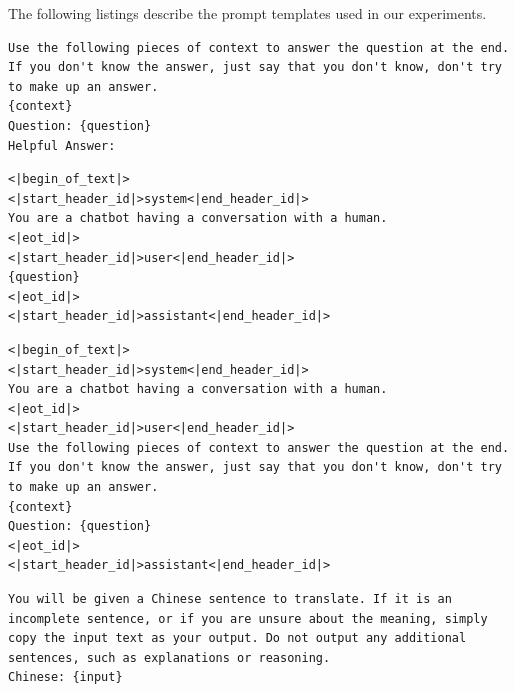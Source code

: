 The following listings describe the prompt templates used in our experiments.

\begin{lstlisting}[caption={RAG - Generic Prompt template for question answering. The placeholders \texttt{\{question\}} and \texttt{\{context\}} are filled with the question and retrieved data, respectively.},label={list:rag-generic},basicstyle=\small\ttfamily,breaklines=true,frame=single]
Use the following pieces of context to answer the question at the end. If you don't know the answer, just say that you don't know, don't try to make up an answer.
{context}
Question: {question}
Helpful Answer:
\end{lstlisting}

\begin{lstlisting}[caption={Non-RAG prompt template for question answering with Llama-3 models. The placeholder \texttt{\{question\}} is filled with the question.},label={list:non-rag},basicstyle=\small\ttfamily,breaklines=true,frame=single]
<|begin_of_text|>
<|start_header_id|>system<|end_header_id|>
You are a chatbot having a conversation with a human.
<|eot_id|>
<|start_header_id|>user<|end_header_id|>
{question}
<|eot_id|>
<|start_header_id|>assistant<|end_header_id|>
\end{lstlisting}

\begin{lstlisting}[caption={RAG - Chat Template for Llama-3 models. The placeholders \texttt{\{question\}} and \texttt{\{context\}} are filled with the question and retrieved data, respectively.},label={list:rag-chat},basicstyle=\small\ttfamily,breaklines=true,frame=single]
<|begin_of_text|>
<|start_header_id|>system<|end_header_id|>
You are a chatbot having a conversation with a human.
<|eot_id|>
<|start_header_id|>user<|end_header_id|>
Use the following pieces of context to answer the question at the end. If you don't know the answer, just say that you don't know, don't try to make up an answer.
{context}
Question: {question}
<|eot_id|>
<|start_header_id|>assistant<|end_header_id|>
\end{lstlisting}

\begin{lstlisting}[caption={Machine Translation - Generic Prompt (MT-GP) for all models. The placeholder \texttt{\{input\}} is filled with the Chinese sentence from the MAC testing set.},label={list:mt-generic},basicstyle=\small\ttfamily,breaklines=true,frame=single]
You will be given a Chinese sentence to translate. If it is an incomplete sentence, or if you are unsure about the meaning, simply copy the input text as your output. Do not output any additional sentences, such as explanations or reasoning.
Chinese: {input}
\end{lstlisting}

